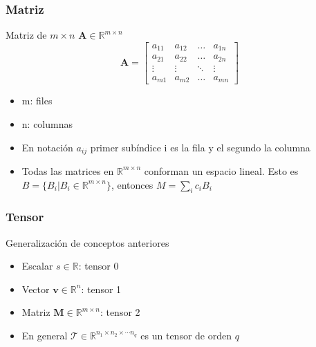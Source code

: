 \documentclass{beamer}
\begin{document}
\begin{frame}
\frametitle{Matriz}
Matriz de $m  \times n$ $\boldsymbol{A} \in \mathbb{R}^{m\times n}$ 
\begin{equation*}
\boldsymbol{A} = \begin{bmatrix} a_{11} &  a_{12} & \dots & a_{1n}\\ a_{21} &  a_{22} & \dots & a_{2n} \\ \vdots &  \vdots & \ddots & \vdots \\ a_{m1} &  a_{m2} & \dots & a_{mn} \end{bmatrix}
\end{equation*}
\begin{itemize}
\item m: files
\item n: columnas
\item En notación $a_{ij}$ primer subíndice i es la fila y el segundo la columna
\item Todas las matrices en $\mathbb{R}^{m\times n}$ conforman un espacio lineal. Esto es $ B=\lbrace B_{i} \vert B_{i} \in \mathbb{R}^{m\times n} \rbrace$, entonces $M = \sum_{i} c_{i}B_{i}$ 

\end{itemize}
\end{frame}
\begin{frame}
\frametitle{Tensor}
 Generalización de conceptos anteriores
\begin{itemize}
\item Escalar $s \in \mathbb{R}$: tensor 0
\item Vector $\boldsymbol{v} \in \mathbb{R}^n$: tensor 1
\item Matriz $\boldsymbol{M} \in \mathbb{R}^{m\times n}$: tensor 2
\item En general $\mathcal{T} \in \mathbb{R}^{n_1\times n_2 \times \cdots n_q}$ es un tensor de orden $q$
\end{itemize}
\end{frame}
\end{document}
